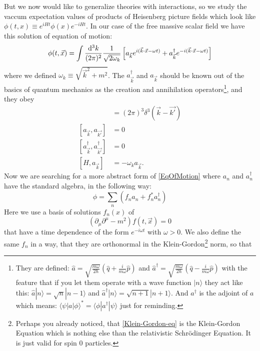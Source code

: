 	But we now would like to generalize theories with interactions, so we study the vaccum expectation values of products of Heisenberg picture fields which look like $\phi(t,x) \equiv e^{iHt} \phi(x) e^{-iHt}$. In our case of the free massive scalar field we have this solution of equation of motion:
		\begin{equation}  \label{EqOfMotion}
			\phi(t,\vec{x}) = \int \frac{\mathrm{d}^3 k}{(2\pi)^2} \frac{1}{\sqrt{2\omega_k}} 
			\left[ a_{\vec{k}} e^{i(\vec{k}\cdot\vec{x}-\omega t)} +
			a^{\dagger}_{\vec{k}} e^{-i(\vec{k}\cdot\vec{x}-\omega t)}
			\right]
		\end{equation}
	where we defined $\omega_k \equiv \sqrt{\vec{k}^2+m^2}$. The $a^{\dagger}_{\vec{k}}$ and $a_{\vec{k}}$ should be known out of the basics of quantum mechanics as the creation and annihilation operators\footnote{They are defined: $\hat{a}= \sqrt{\frac{m\omega}{2\hbar}} 
		\left(\hat{q} + \frac{i}{m\omega}\hat{p}
		\right)
		$ and 
		$ \hat{a}^{\dagger}= \sqrt{\frac{m\omega}{2\hbar}} 
		\left(\hat{q} - \frac{i}{m\omega}\hat{p}
		\right)
		$
	with the feature that if you let them operate with a wave function $|n\rangle$ they act like this:
	$\hat{a}|n\rangle = \sqrt{n}|n-1\rangle$ and $\hat{a}^{\dagger}|n\rangle= \sqrt{n+1}|n+1\rangle$.
	And $a^{\dagger}$ is the adjoint of $a$ which means: $\langle \psi | a | \phi \rangle^*= \langle \phi | a^{\dagger} | \psi \rangle$ just for reminding.
	}, and they obey
		\begin{align*}
			[a_{\vec{k}},a^{\dagger}_{\vec{k'}}]&= (2\pi)^3 \delta^3 (\vec{k}-\vec{k'})\\
			[a_{\vec{k}},a_{\vec{k'}}]&=0 \\
			[a^{\dagger}_{\vec{k}},a^{\dagger}_{\vec{k'}}]&=0 \\
			[H,a_{\vec{k}}]&=-\omega_k a_{\vec{k}}.
		\end{align*}
	Now we are searching for a more abstract form of \eqref{EqOfMotion} where $a_n$ and $a^{\dagger}_n$ have the standard algebra, in the following way:
		\begin{equation} \label{wave_fct}
			\phi = \sum_n \left(f_n a_n + f^*_n a^{\dagger}_n \right)
		\end{equation}
	Here we use a basis of solutions $f_n(x)$ of
		\begin{equation} \label{Klein-Gordon-eq}
			\left( \partial_{\mu}\partial^{\mu} - m^2 \right) f(t,\vec{x})=0
		\end{equation}			
	that have a time dependence of the form $e^{-i\omega t}$ with $\omega>0$. We also define the same $f_n$ in a way, that they are orthonormal in the Klein-Gordon\footnote{Perhaps you already noticed, that \eqref{Klein-Gordon-eq} is the Klein-Gordon Equation which is nothing else than the relativistic Schrödinger Equation. It is just valid for spin 0 particles.} norm, so that

